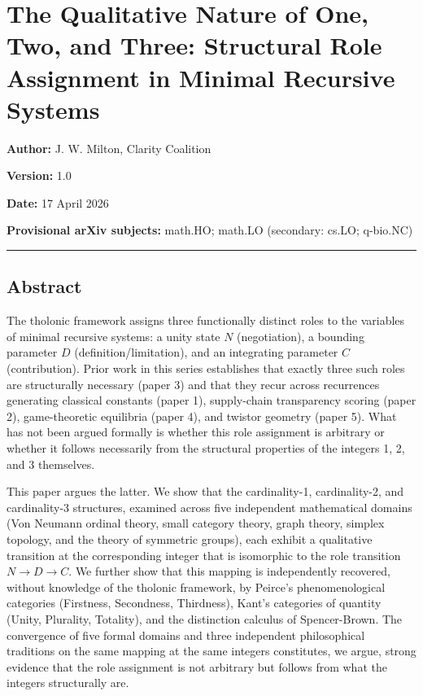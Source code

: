 \documentclass[
  11pt,
  letterpaper,
]{article}
\author{}
\date{}
\begin{document}
\section{The Qualitative Nature of One, Two, and Three: Structural Role
Assignment in Minimal Recursive
Systems}\label{the-qualitative-nature-of-one-two-and-three-structural-role-assignment-in-minimal-recursive-systems}

\textbf{Author:} J. W. Milton, Clarity Coalition

\textbf{Version:} 1.0

\textbf{Date:} 17 April 2026

\textbf{Provisional arXiv subjects:} math.HO; math.LO (secondary: cs.LO;
q-bio.NC)

\begin{center}\rule{0.5\linewidth}{0.5pt}\end{center}

\subsection{Abstract}\label{abstract}

The tholonic framework assigns three functionally distinct roles to the
variables of minimal recursive systems: a unity state \(N\)
(negotiation), a bounding parameter \(D\) (definition/limitation), and
an integrating parameter \(C\) (contribution). Prior work in this series
establishes that exactly three such roles are structurally necessary
(paper 3) and that they recur across recurrences generating classical
constants (paper 1), supply-chain transparency scoring (paper 2),
game-theoretic equilibria (paper 4), and twistor geometry (paper 5).
What has not been argued formally is whether this role assignment is
arbitrary or whether it follows necessarily from the structural
properties of the integers 1, 2, and 3 themselves.

This paper argues the latter. We show that the cardinality-1,
cardinality-2, and cardinality-3 structures, examined across five
independent mathematical domains (Von Neumann ordinal theory, small
category theory, graph theory, simplex topology, and the theory of
symmetric groups), each exhibit a qualitative transition at the
corresponding integer that is isomorphic to the role transition
\(N \to D \to C\). We further show that this mapping is independently
recovered, without knowledge of the tholonic framework, by Peirce's
phenomenological categories (Firstness, Secondness, Thirdness), Kant's
categories of quantity (Unity, Plurality, Totality), and the distinction
calculus of Spencer-Brown. The convergence of five formal domains and
three independent philosophical traditions on the same mapping at the
same integers constitutes, we argue, strong evidence that the role
assignment is not arbitrary but follows from what the integers
structurally are.
\end{document}
